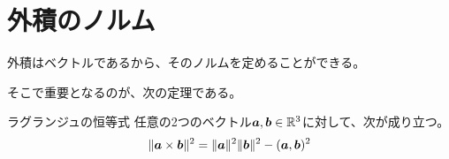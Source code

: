 \documentclass[../../../topic_linear-algebra]{subfiles}
\begin{document}
\sectionline
\section{外積のノルム}

外積はベクトルであるから、そのノルムを定めることができる。

\br

そこで重要となるのが、次の定理である。

\begin{theorem}{ラグランジュの恒等式}
  任意の2つのベクトル$\vb*{a}, \vb*{b} \in \mathbb{R}^3$に対して、次が成り立つ。
  \begin{equation*}
    \| \vb*{a} \times \vb*{b} \|^2 = \| \vb*{a} \|^2 \| \vb*{b} \|^2 - ( \vb*{a} ,\vb*{b} )^2
  \end{equation*}
\end{theorem}
\end{document}
